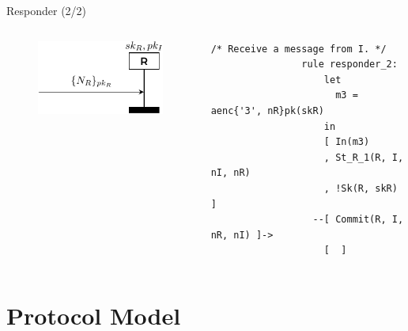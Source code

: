 \documentclass[11pt,aspectratio=169]{beamer}
\begin{document}
\begin{frame}[fragile]{Responder (2/2)}
    \begin{columns}
        \begin{column}{0.5\textwidth}
            \begin{figure}
                \includegraphics[width=.8\textwidth]
                    {./figures/lecture_3/nspk_r2}
            \end{figure}
        \end{column}
        \begin{column}{0.5\textwidth}
            \begin{lstlisting}[style=tamarin, gobble=16]
                /* Receive a message from I. */
                rule responder_2:
                    let
                      m3 = aenc{'3', nR}pk(skR)
                    in
                    [ In(m3)
                    , St_R_1(R, I, nI, nR)
                    , !Sk(R, skR) ]
                  --[ Commit(R, I, nR, nI) ]->
                    [  ]
            \end{lstlisting}
        \end{column}
    \end{columns}
    \vsep
\end{frame}


\section{Protocol Model}

\end{document}
